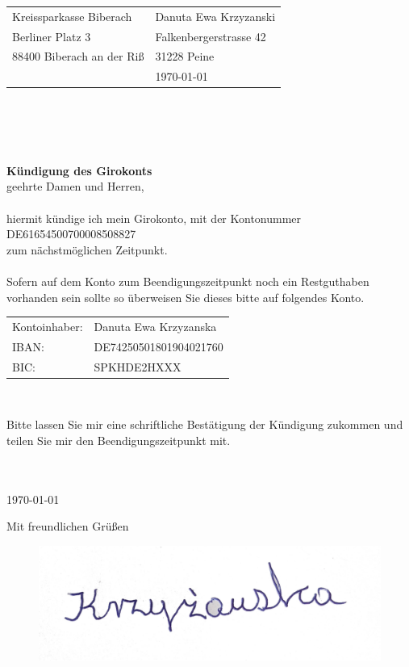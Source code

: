 \documentclass{letter}
\begin{document}
\begin{letter}{}
\begin{tabular}{@{}p{3.0in}l}
Kreissparkasse Biberach        	& Danuta Ewa Krzyzanski\\
Berliner Platz 3   				& Falkenbergerstrasse 42\\
88400 Biberach an der Ri\ss     & 31228 Peine\\
				  				& \today
\end{tabular}\\ \\ \\ \\
\bigskip
\Large\textbf{K\"undigung des Girokonts}\\
\bigskip
\normalsize
\Sehr geehrte Damen und Herren, \\\\
hiermit kündige ich mein Girokonto, mit der Kontonummer \\DE61654500700008508827\\ zum nächstmöglichen Zeitpunkt.\\\\
Sofern auf dem Konto zum Beendigungszeitpunkt noch ein Restguthaben vorhanden sein sollte so überweisen Sie dieses bitte auf folgendes Konto.\\
\bigskip
\hline
\begin{tabular}{l l}
	Kontoinhaber:	&	Danuta Ewa Krzyzanska\\
	IBAN:			&	DE74250501801904021760\\
	BIC:			&	SPKHDE2HXXX\\
\end{tabular}\\
\hline

Bitte lassen Sie mir eine schriftliche Bestätigung der Kündigung zukommen und teilen Sie mir den Beendigungszeitpunkt mit.\\ \\
\\
\bigskip

\today
 
\closing{Mit freundlichen Grüßen}
\begin{figure}
  \includegraphics[width=0.5\linewidth]{podpis.jpg}
\end{figure}



\end{letter}
\end{document}

